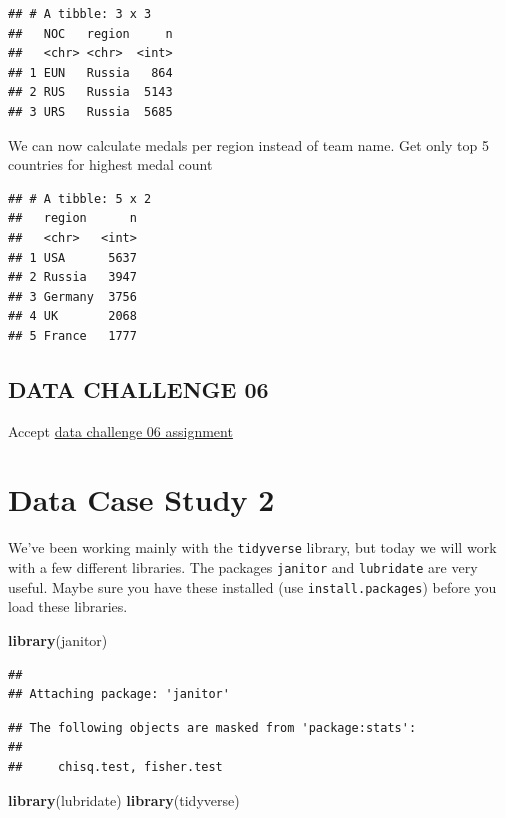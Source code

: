 \documentclass[
]{book}
\newenvironment{Shaded}{\begin{snugshade}}{\end{snugshade}}
\newcommand{\KeywordTok}[1]{\textcolor[rgb]{0.13,0.29,0.53}{\textbf{#1}}}
\newcommand{\NormalTok}[1]{#1}
\begin{document}
\begin{verbatim}
## # A tibble: 3 x 3
##   NOC   region     n
##   <chr> <chr>  <int>
## 1 EUN   Russia   864
## 2 RUS   Russia  5143
## 3 URS   Russia  5685
\end{verbatim}

We can now calculate medals per region instead of team name.
Get only top 5 countries for highest medal count

\begin{verbatim}
## # A tibble: 5 x 2
##   region      n
##   <chr>   <int>
## 1 USA      5637
## 2 Russia   3947
## 3 Germany  3756
## 4 UK       2068
## 5 France   1777
\end{verbatim}

\hypertarget{data-challenge-06}{%
\section{DATA CHALLENGE 06}\label{data-challenge-06}}

Accept \href{}{data challenge 06 assignment}

\hypertarget{data-case-study-2}{%
\chapter{Data Case Study 2}\label{data-case-study-2}}

We've been working mainly with the \texttt{tidyverse} library, but today we will work with a few different libraries. The packages \texttt{janitor} and \texttt{lubridate} are very useful. Maybe sure you have these installed (use \texttt{install.packages}) before you load these libraries.

\begin{Shaded}
\begin{Highlighting}[]
\KeywordTok{library}\NormalTok{(janitor)}
\end{Highlighting}
\end{Shaded}

\begin{verbatim}
## 
## Attaching package: 'janitor'
\end{verbatim}

\begin{verbatim}
## The following objects are masked from 'package:stats':
## 
##     chisq.test, fisher.test
\end{verbatim}

\begin{Shaded}
\begin{Highlighting}[]
\KeywordTok{library}\NormalTok{(lubridate)}
\KeywordTok{library}\NormalTok{(tidyverse)}
\end{Highlighting}
\end{Shaded}
\end{document}
